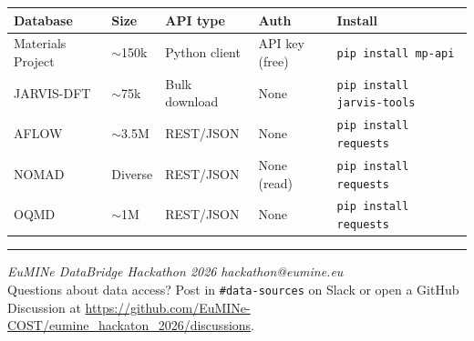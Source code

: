 \documentclass[11pt,a4paper]{article}
\begin{document}
\begin{center}
\begin{tabular}{lllll}
\toprule
Database & Size & API type & Auth & Install \\
\midrule
Materials Project & $\sim$150k & Python client & API key (free) & \texttt{pip install mp-api} \\
JARVIS-DFT        & $\sim$75k  & Bulk download & None           & \texttt{pip install jarvis-tools} \\
AFLOW             & $\sim$3.5M & REST/JSON      & None           & \texttt{pip install requests} \\
NOMAD             & Diverse    & REST/JSON      & None (read)    & \texttt{pip install requests} \\
OQMD              & $\sim$1M   & REST/JSON      & None           & \texttt{pip install requests} \\
\bottomrule
\end{tabular}
\end{center}

\vspace{2em}
\noindent\rule{\linewidth}{0.4pt}
{\small
\textit{EuMINe DataBridge Hackathon 2026} \hfill \textit{hackathon@eumine.eu}\\
Questions about data access? Post in \texttt{\#data-sources} on Slack or open a
GitHub Discussion at
\url{https://github.com/EuMINe-COST/eumine_hackaton_2026/discussions}.
}
\end{document}
